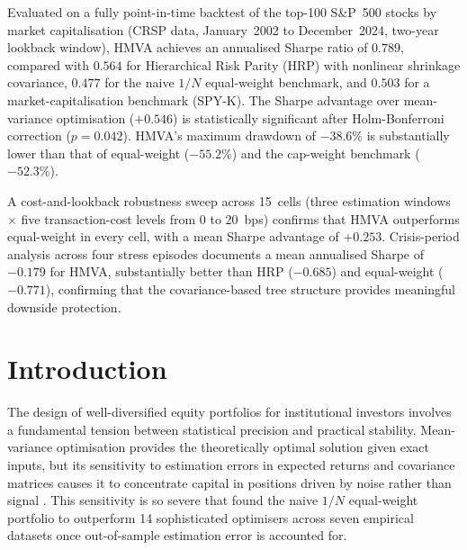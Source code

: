\documentclass[a4paper,12pt]{report}
\begin{document}
Evaluated on a fully point-in-time backtest of the top-100 S\&P~500 stocks by
market capitalisation (CRSP data, January~2002 to December~2024, two-year
lookback window), HMVA achieves an annualised Sharpe ratio of $0.789$, compared
with $0.564$ for Hierarchical Risk Parity (HRP) with nonlinear shrinkage
covariance, $0.477$ for the naive $1/N$ equal-weight benchmark, and $0.503$
for a market-capitalisation benchmark (SPY-K). The Sharpe advantage over
mean-variance optimisation ($+0.546$) is statistically significant after
Holm-Bonferroni correction ($p = 0.042$). HMVA's maximum drawdown of $-38.6\%$
is substantially lower than that of equal-weight ($-55.2\%$) and the cap-weight
benchmark ($-52.3\%$).

A cost-and-lookback robustness sweep across 15~cells (three estimation windows
$\times$ five transaction-cost levels from 0 to 20~bps) confirms that HMVA
outperforms equal-weight in every cell, with a mean Sharpe advantage of
$+0.253$. Crisis-period analysis across four stress episodes documents a mean
annualised Sharpe of $-0.179$ for HMVA, substantially better than HRP
($-0.685$) and equal-weight ($-0.771$), confirming that the covariance-based
tree structure provides meaningful downside protection.

\newpage
\tableofcontents
\newpage
\listoffigures
\listoftables

\chapter{Introduction}
\label{ch:intro}

The design of well-diversified equity portfolios for institutional investors
involves a fundamental tension between statistical precision and practical
stability. Mean-variance optimisation \citep{markowitz1952} provides the
theoretically optimal solution given exact inputs, but its sensitivity to
estimation errors in expected returns and covariance matrices causes it to
concentrate capital in positions driven by noise rather than signal
\citep{michaud1989}. This sensitivity is so severe that \citet{demiguel2009}
found the naive $1/N$ equal-weight portfolio to outperform 14 sophisticated
optimisers across seven empirical datasets once out-of-sample estimation error
is accounted for.
\end{document}
